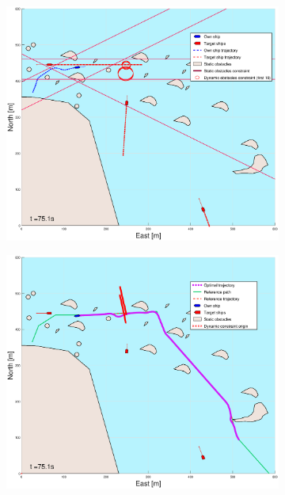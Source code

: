 \begin{figure}[!ht]
\begin{subfigure}[b]{0.499\textwidth}
    \end{subfigure}
    \hfill
    \\
    \begin{subfigure}[b]{0.49\textwidth}
        \centering
        \includegraphics[width=\textwidth]{Images/Figures/skjergard_m_trafikk_NEW/_Simple_0fig1_time=75}
    \end{subfigure}
    \hfill
    \begin{subfigure}[b]{0.499\textwidth}
        \centering
        \includegraphics[width=\textwidth]{Images/Figures/skjergard_m_trafikk_NEW/_Simple_0fig999_time=75}
    \end{subfigure}
    \hfill
\end{figure}%
